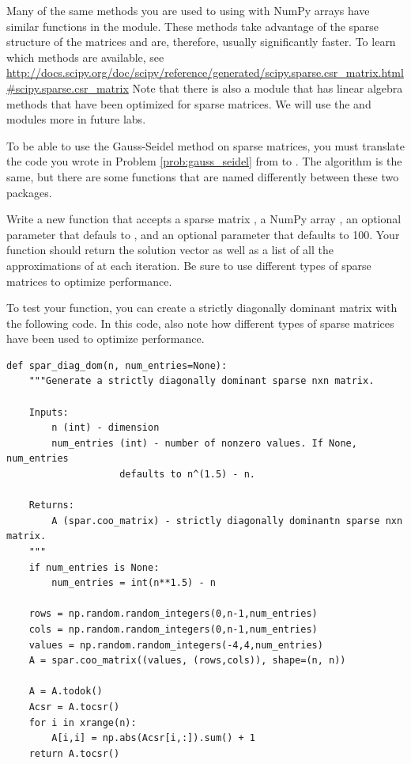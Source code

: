 Many of the same methods you are used to using with NumPy arrays have similar
functions in the  module. These methods take advantage of the
sparse structure of the matrices and are, therefore, usually significantly faster.
To learn which methods are available, see
\url{http://docs.scipy.org/doc/scipy/reference/generated/scipy.sparse.csr_matrix.html#scipy.sparse.csr_matrix}
Note that there is also a  module that has linear algebra
methods that have been optimized for sparse matrices. We will use the
 and  modules more in future labs.

\begin{problem}
To be able to use the Gauss-Seidel method on sparse matrices, you must translate
the code you wrote in Problem \ref{prob:gauss_seidel} from  to .
The algorithm is the same, but there are some functions that are named differently
between these two packages.

Write a new function that accepts a sparse matrix , a NumPy array ,
an optional parameter  that defauls to , and an optional parameter
 that defaults to 100. Your function should return the solution
vector  as well as a list of all the approximations of  at each
iteration. Be sure to use different types of sparse matrices to optimize
performance.

To test your function, you can create a strictly diagonally dominant matrix with
the following code. In this code, also note how different types of sparse matrices
have been used to optimize performance.
\begin{lstlisting}
def spar_diag_dom(n, num_entries=None):
    """Generate a strictly diagonally dominant sparse nxn matrix.

    Inputs:
        n (int) - dimension
        num_entries (int) - number of nonzero values. If None, num_entries
                    defaults to n^(1.5) - n.

    Returns:
        A (spar.coo_matrix) - strictly diagonally dominantn sparse nxn matrix.
    """
    if num_entries is None:
        num_entries = int(n**1.5) - n

    rows = np.random.random_integers(0,n-1,num_entries)
    cols = np.random.random_integers(0,n-1,num_entries)
    values = np.random.random_integers(-4,4,num_entries)
    A = spar.coo_matrix((values, (rows,cols)), shape=(n, n))

    A = A.todok()
    Acsr = A.tocsr()
    for i in xrange(n):
        A[i,i] = np.abs(Acsr[i,:]).sum() + 1
    return A.tocsr()
\end{lstlisting}

\end{problem}

